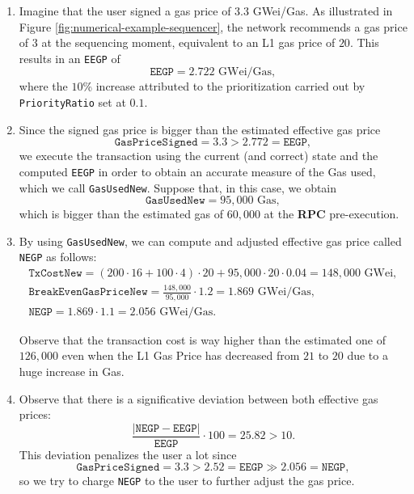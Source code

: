 \begin{enumerate}

\item Imagine that the user signed a gas price of $3.3$ GWei/Gas. As illustrated in Figure \ref{fig:numerical-example-sequencer}, the network recommends a gas price of $3$ at the sequencing moment, equivalent to an L1 gas price of $20$. This results in an \texttt{EEGP} of
\[
\texttt{EEGP} = 2.722 \text{ GWei/Gas},
\]
where the $10$\% increase attributed to the prioritization carried out by \texttt{PriorityRatio} set at $0.1$.

\item Since the signed gas price is bigger than the estimated effective gas price
\[
\texttt{GasPriceSigned} = 3.3 > 2.772 = \texttt{EEGP},
\]
we execute the transaction using the current (and correct) state and the computed \texttt{EEGP} in order to obtain an accurate measure of the Gas used, which we call \texttt{GasUsedNew}. Suppose that, in this case, we obtain
\[
\texttt{GasUsedNew} = 95,000 \text{ Gas},
\]
which is bigger than the estimated gas of $60,000$ at the \textbf{RPC} pre-execution.

\item By using \texttt{GasUsedNew}, we can compute and adjusted effective gas price called \texttt{NEGP} as follows:
\begin{gather*}
\texttt{TxCostNew} = (200 \cdot 16 + 100 \cdot 4) \cdot 20 + 95,000 \cdot 20 \cdot 0.04 = 148,000 \text{ GWei}, \\
\texttt{BreakEvenGasPriceNew} = \frac{148,000}{95,000} \cdot 1.2 = 1.869 \text{ GWei/Gas}, \\
\texttt{NEGP} = 1.869 \cdot 1.1 = 2.056 \text{ GWei/Gas}.
\end{gather*}

Observe that the transaction cost is way higher than the estimated one of $126,000$ even when the L1 Gas Price has decreased from $21$ to $20$ due to a huge increase in Gas.

\item Observe that there is a significative deviation between both effective gas prices:
\[
\frac{\vert \texttt{NEGP} - \texttt{EEGP} \vert}{\texttt{EEGP}} \cdot 100 = 25.82 > 10.
\]
This deviation penalizes the user a lot since
\[
\texttt{GasPriceSigned} = 3.3 > 2.52 = \texttt{EEGP} \gg 2.056 = \texttt{NEGP},
\]
so we try to charge \texttt{NEGP} to the user to further adjust the gas price.


\end{enumerate}
